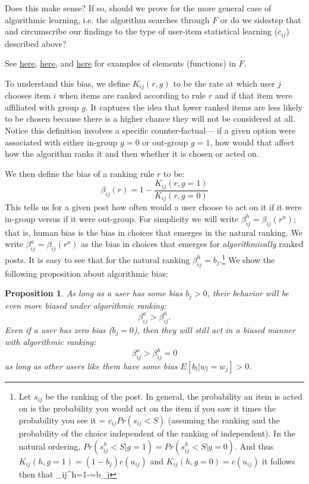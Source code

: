\documentclass[12pt,letterpaper]{article}
\newtheorem{prop}[theorem]{Proposition}
\begin{document}
{Does this make sense? If so, should we prove for the more general case of algorithmic learning, i.e. the algorithm searches through $F$ or do we sidestep that and circumscribe our findings to the type of user-item statistical learning ($\bar{c}_{ij}$) described above?

See \href{https://developers.google.com/machine-learning/recommendation/content-based/basics}{here}, \href{https://en.wikipedia.org/wiki/Preference_learning}{here}, and \href{https://en.wikipedia.org/wiki/Learning_to_rankfor}{here} for examples of elements (functions) in $F$.}

To understand this bias, we define $K_{ij}(r,g)$ to be the rate at which user $j$ chooses item $i$ when items are ranked according to rule $r$ and if that item were affiliated with group $g$. It captures the idea that lower ranked items are less likely to be chosen because there is a higher chance they will not be considered at all. Notice this definition involves a specific counter-factual--- if a given option were associated with either in-group $g=0$ or out-group $g=1$, how would that affect how the algorithm ranks it and then whether it is chosen or acted on.  

We then define the bias of a ranking rule $r$ to be:
$$\beta_{ij}(r) = 1- \frac{K_{ij}(r,g=1)}{K_{ij}(r,g=0)}$$
This tells us for a given post how often would a user choose to act on it if it were in-group versus if it were out-group. For simplicity we will write $\beta_{ij}^h = \beta_{ij}(r^n)$; that is, human bias is the bias in choices that emerges in the natural ranking. We write $\beta_{ij}^a = \beta_{ij}(r^a)$ as the bias in choices that emerges for \emph{algorithmically} ranked posts. 
It is easy to see that for the natural ranking $\beta_{ij}^h = b_j$.\footnote{Let $s_{ij}$ be the ranking of the post. In general, the probability an item is acted on is the probability you would act on the item if you saw it times the probability you see it = $c_{ij}Pr(s_{ij}<S)$ (assuming the ranking and the probability of the choice independent of the ranking of independent). In the natural ordering, $Pr(s^h_{ij}<S| g=1)=Pr(s^h_{ij}<S|g=0)$. And thus $K_{ij}(h, g=1)=(1-b_j)c(u_{ij})$ and $K_{ij}(h, g=0)=c(u_{ij})$ it follows then that \beta_{ij}^h=1-=b_j } We show the following proposition about algorithmic bias: 

\begin{prop}
As long as a user has some bias $b_j >0$, their behavior will be even more biased under algorithmic ranking: 
$$\beta_{ij}^a > \beta_{ij}^h.$$ 
Even if a user has zero bias ($b_j=0$), then they will still act in a biased manner with algorithmic ranking: $$\beta_{ij}^a > \beta_{ij}^h =0$$ 
as long as other users like them have some bias $E[b_l|w_l=w_j] >0$. 
\end{prop}
\end{document}
